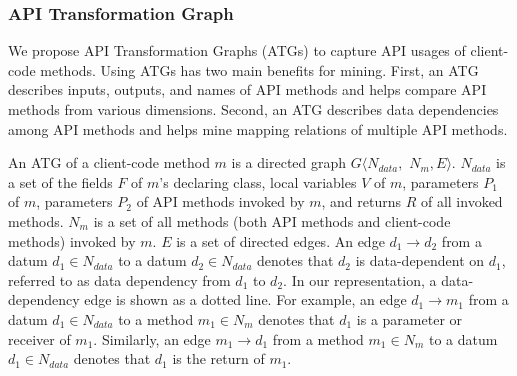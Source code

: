 \subsubsection{API Transformation Graph}
\label{sec:approach:mappingmethods:graph}
We propose API Transformation Graphs (ATGs) to capture API usages of client-code methods. Using ATGs has two main benefits for mining. First, an ATG describes inputs, outputs, and names of API methods and helps compare API methods from various dimensions. Second, an ATG describes data dependencies among API methods and helps mine mapping relations of multiple API methods.

An ATG of a client-code method $m$ is a directed graph $G\langle N_{data},$ $ N_m, E\rangle$.
$N_{data}$ is a set of the fields $F$ of $m$'s declaring class, local variables $V$ of
$m$, parameters $P_1$ of $m$, parameters $P_2$ of API methods invoked
by $m$, and returns $R$ of all invoked methods. $N_{m}$ is a set of 
all methods (both API methods and client-code methods) invoked by $m$. $E$ is a set of directed edges. An edge
$d_1\rightarrow d_2$ from a datum $d_1 \in N_{data}$ to a datum $d_2
\in N_{data}$ denotes that $d_2$ is data-dependent on $d_1$, referred to as
data dependency from $d_1$ to $d_2$. In our representation, a data-dependency
edge is shown as a dotted line. For example, 
an edge $d_1 \rightarrow m_1$ from a datum $d_1 \in N_{data}$ to a
method $ m_1 \in N_{m}$ denotes that $d_1$ is a parameter or receiver
of $m_1$. Similarly, an edge $m_1 \rightarrow d_1$ from a method $m_1
\in N_{m}$ to a datum $d_1 \in N_{data}$ denotes that $d_1$ is the return
of $m_1$.

%
%
%

